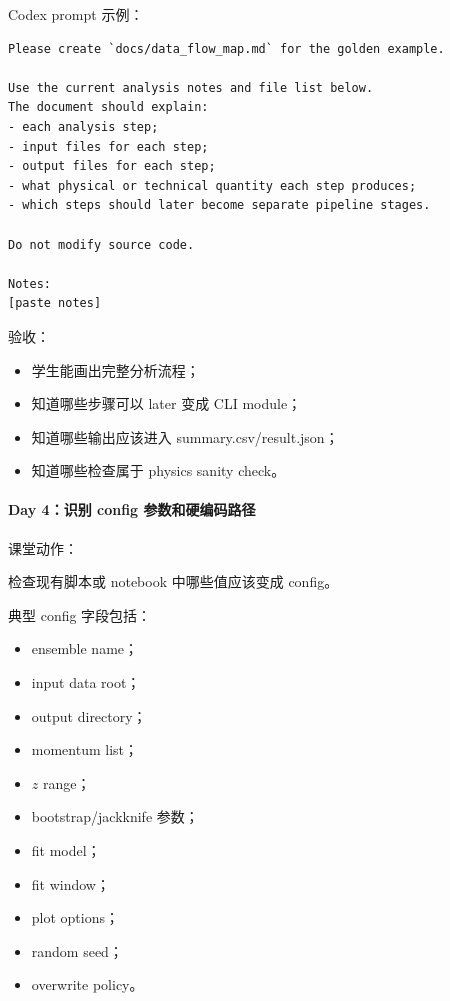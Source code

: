 \documentclass[11pt,a4paper,fontset=fandol]{ctexart}
\begin{document}
Codex prompt 示例：

\begin{lstlisting}
Please create `docs/data_flow_map.md` for the golden example.

Use the current analysis notes and file list below.
The document should explain:
- each analysis step;
- input files for each step;
- output files for each step;
- what physical or technical quantity each step produces;
- which steps should later become separate pipeline stages.

Do not modify source code.

Notes:
[paste notes]
\end{lstlisting}

验收：

\begin{itemize}[leftmargin=2em]
  \item 学生能画出完整分析流程；
  \item 知道哪些步骤可以 later 变成 CLI module；
  \item 知道哪些输出应该进入 summary.csv/result.json；
  \item 知道哪些检查属于 physics sanity check。
\end{itemize}

\paragraph{Day 4：识别 config 参数和硬编码路径}

课堂动作：

检查现有脚本或 notebook 中哪些值应该变成 config。

典型 config 字段包括：

\begin{itemize}[leftmargin=2em]
  \item ensemble name；
  \item input data root；
  \item output directory；
  \item momentum list；
  \item $z$ range；
  \item bootstrap/jackknife 参数；
  \item fit model；
  \item fit window；
  \item plot options；
  \item random seed；
  \item overwrite policy。
\end{itemize}
\end{document}
